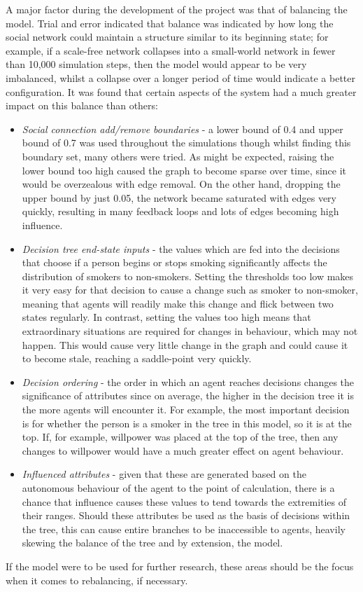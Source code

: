 \documentclass[]{report}
\begin{document}
A major factor during the development of the project was that of balancing the model. Trial and error indicated that balance was indicated by how long the social network could maintain a structure similar to its beginning state; for example, if a scale-free network collapses into a small-world network in fewer than 10,000 simulation steps, then the model would appear to be very imbalanced, whilst a collapse over a longer period of time would indicate a better configuration. It was found that certain aspects of the system had a much greater impact on this balance than others:
\begin{itemize}
\item \emph{Social connection add/remove boundaries} - a lower bound of 0.4 and upper bound of 0.7 was used throughout the simulations though whilst finding this boundary set, many others were tried. As might be expected, raising the lower bound too high caused the graph to become sparse over time, since it would be overzealous with edge removal. On the other hand, dropping the upper bound by just 0.05, the network became saturated with edges very quickly, resulting in many feedback loops and lots of edges becoming high influence.
\item \emph{Decision tree end-state inputs} - the values which are fed into the decisions that choose if a person begins or stops smoking significantly affects the distribution of smokers to non-smokers. Setting the thresholds too low makes it very easy for that decision to cause a change such as smoker to non-smoker, meaning that agents will readily make this change and flick between two states regularly. In contrast, setting the values too high means that extraordinary situations are required for changes in behaviour, which may not happen. This would cause very little change in the graph and could cause it to become stale, reaching a saddle-point very quickly.
\item \emph{Decision ordering} - the order in which an agent reaches decisions changes the significance of attributes since on average, the higher in the decision tree it is the more agents will encounter it. For example, the most important decision is for whether the person is a smoker in the tree in this model, so it is at the top. If, for example, willpower was placed at the top of the tree, then any changes to willpower would have a much greater effect on agent behaviour.
\item \emph{Influenced attributes} - given that these are generated based on the autonomous behaviour of the agent to the point of calculation, there is a chance that influence causes these values to tend towards the extremities of their ranges. Should these attributes be used as the basis of decisions within the tree, this can cause entire branches to be inaccessible to agents, heavily skewing the balance of the tree and by extension, the model.
\end{itemize}
If the model were to be used for further research, these areas should be the focus when it comes to rebalancing, if necessary.
\end{document}
